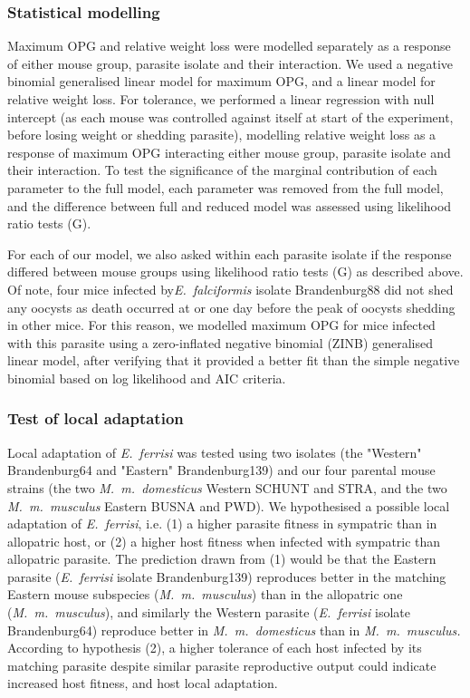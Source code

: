 \subsubsection{Statistical modelling}

Maximum OPG and relative weight loss were modelled separately as a response of either mouse group, parasite isolate and their interaction. We used a negative binomial generalised linear model for maximum OPG, and a linear model for relative weight loss. For tolerance, we performed a linear regression with null intercept (as each mouse was controlled against itself at start of the experiment, before losing weight or shedding parasite), modelling relative weight loss as a response of maximum OPG interacting either mouse group, parasite isolate and their interaction. To test the significance of the marginal contribution of each parameter to the full model, each parameter was removed from the full model, and the difference between full and reduced model was assessed using likelihood ratio tests (G). \par

For each of our model, we also asked within each parasite isolate if the response differed between mouse groups using likelihood ratio tests (G) as described above. Of note, four mice infected by\textit{E.~falciformis} isolate Brandenburg88 did not shed any oocysts as death occurred at or one day before the peak of oocysts shedding in other mice. For this reason, we modelled maximum OPG for mice infected with this parasite using a zero-inflated negative binomial (ZINB) generalised linear model, after verifying that it provided a better fit than the simple negative binomial based on log likelihood and AIC criteria.\par

\subsubsection{Test of local adaptation}

Local adaptation of \textit{E.~ferrisi} was tested using two isolates (the "Western" Brandenburg64 and "Eastern" Brandenburg139) and our four parental mouse strains (the two \textit{M.~m.~domesticus} Western SCHUNT and STRA, and the two \textit{M.~m.~musculus }Eastern BUSNA and PWD). We hypothesised a possible local adaptation of \textit{E.~ferrisi}, i.e. (1) a higher parasite fitness in sympatric than in allopatric host, or (2) a higher host fitness when infected with sympatric than allopatric parasite. The prediction drawn from (1) would be that the Eastern parasite (\textit{E.~ferrisi} isolate Brandenburg139) reproduces better in the matching Eastern mouse subspecies (\textit{M.~m.~musculus}) than in the allopatric one (\textit{M.~m.~musculus}), and similarly the Western parasite (\textit{E.~ferrisi} isolate Brandenburg64) reproduce better in \textit{M.~m.~domesticus} than in \textit{M.~m.~musculus.} According to hypothesis (2), a higher tolerance of each host infected by its matching parasite despite similar parasite reproductive output could indicate increased host fitness, and host local adaptation.\par

